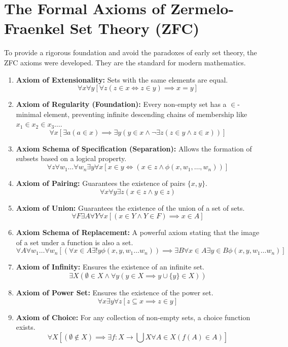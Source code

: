 \documentclass[11pt, a4paper]{article}
\begin{document}
\section{The Formal Axioms of Zermelo-Fraenkel Set Theory (ZFC)}
To provide a rigorous foundation and avoid the paradoxes of early set theory, the ZFC axioms were developed. They are the standard for modern mathematics.
\begin{enumerate}
    \item \textbf{Axiom of Extensionality:} Sets with the same elements are equal.
    $$ \forall x \forall y [\forall z (z \in x \iff z \in y) \implies x=y] $$
    \item \textbf{Axiom of Regularity (Foundation):} Every non-empty set has a $\in$-minimal element, preventing infinite descending chains of membership like $x_1 \in x_2 \in x_3 \dots$.
    $$ \forall x [\exists a (a \in x) \implies \exists y (y \in x \land \lnot \exists z (z \in y \land z \in x))] $$
    \item \textbf{Axiom Schema of Specification (Separation):} Allows the formation of subsets based on a logical property.
    $$ \forall z \forall w_1 \dots \forall w_n \exists y \forall x [x \in y \iff (x \in z \land \phi(x, w_1, \dots, w_n))] $$
    \item \textbf{Axiom of Pairing:} Guarantees the existence of pairs $\{x, y\}$.
    $$ \forall x \forall y \exists z (x \in z \land y \in z) $$
    \item \textbf{Axiom of Union:} Guarantees the existence of the union of a set of sets.
    $$ \forall F \exists A \forall Y \forall x [(x \in Y \land Y \in F) \implies x \in A] $$
    \item \textbf{Axiom Schema of Replacement:} A powerful axiom stating that the image of a set under a function is also a set.
    $$ \forall A \forall w_1 \dots \forall w_n [(\forall x \in A \exists! y \phi(x,y,w_1 \dots w_n)) \implies \exists B \forall x \in A \exists y \in B \phi(x,y,w_1 \dots w_n)] $$
    \item \textbf{Axiom of Infinity:} Ensures the existence of an infinite set.
    $$ \exists X (\emptyset \in X \land \forall y (y \in X \implies y \cup \{y\} \in X)) $$
    \item \textbf{Axiom of Power Set:} Ensures the existence of the power set.
    $$ \forall x \exists y \forall z [z \subseteq x \implies z \in y] $$
    \item \textbf{Axiom of Choice:} For any collection of non-empty sets, a choice function exists.
    $$ \forall X [(\emptyset \notin X) \implies \exists f: X \to \bigcup X \forall A \in X (f(A) \in A)] $$
\end{enumerate}
\end{document}
